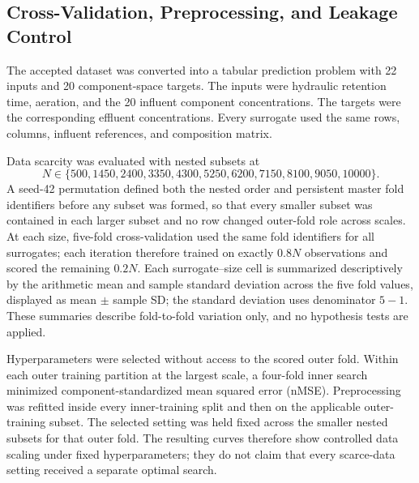 \documentclass[a4paper,fleqn]{cas-sc}
\begin{document}
\subsection{Cross-Validation, Preprocessing, and Leakage Control}

The accepted dataset was converted into a tabular prediction problem with 22 inputs and 20 component-space targets. The inputs were hydraulic retention time, aeration, and the 20 influent component concentrations. The targets were the corresponding effluent concentrations. Every surrogate used the same rows, columns, influent references, and composition matrix.

Data scarcity was evaluated with nested subsets at
\begin{equation}
N\in\{500,1450,2400,3350,4300,5250,6200,7150,8100,9050,10000\}.
\end{equation}
A seed-42 permutation defined both the nested order and persistent master fold identifiers before any subset was formed, so that every smaller subset was contained in each larger subset and no row changed outer-fold role across scales. At each size, five-fold cross-validation used the same fold identifiers for all surrogates; each iteration therefore trained on exactly $0.8N$ observations and scored the remaining $0.2N$. Each surrogate--size cell is summarized descriptively by the arithmetic mean and sample standard deviation across the five fold values, displayed as mean $\pm$ sample SD; the standard deviation uses denominator $5-1$. These summaries describe fold-to-fold variation only, and no hypothesis tests are applied.

Hyperparameters were selected without access to the scored outer fold. Within each outer training partition at the largest scale, a four-fold inner search minimized component-standardized mean squared error (nMSE). Preprocessing was refitted inside every inner-training split and then on the applicable outer-training subset. The selected setting was held fixed across the smaller nested subsets for that outer fold. The resulting curves therefore show controlled data scaling under fixed hyperparameters; they do not claim that every scarce-data setting received a separate optimal search.
\end{document}
